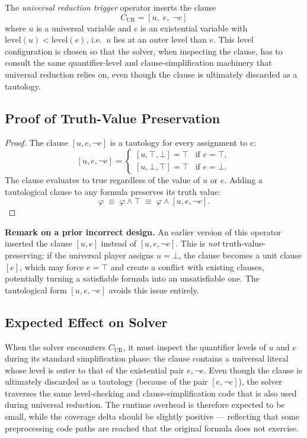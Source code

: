 The \emph{universal reduction trigger} operator inserts the clause
\[
  C_{\mathrm{UR}} = [u,\; e,\; \lnot e]
\]
where $u$ is a universal variable and $e$ is an existential variable with $\mathrm{level}(u) < \mathrm{level}(e)$, i.e.\ $u$ lies at an outer level than $e$. This level configuration is chosen so that the solver, when inspecting the clause, has to consult the same quantifier-level and clause-simplification machinery that universal reduction relies on, even though the clause is ultimately discarded as a tautology.

\subsection{Proof of Truth-Value Preservation}

\begin{proof}
The clause $[u, e, \lnot e]$ is a tautology for every assignment to $e$:
\[
  [u, e, \lnot e] =
  \begin{cases}
    [u, \top, \bot] = \top & \text{if } e = \top,\\
    [u, \bot, \top] = \top & \text{if } e = \bot.
  \end{cases}
\]
The clause evaluates to true regardless of the value of $u$ or $e$. Adding a tautological clause to any formula preserves its truth value:
\[
  \varphi \;\equiv\; \varphi \land \top \;\equiv\; \varphi \land [u, e, \lnot e].
\]
\end{proof}

\textbf{Remark on a prior incorrect design.} An earlier version of this operator inserted the clause $[u, e]$ instead of $[u, e, \lnot e]$. This is \emph{not} truth-value-preserving: if the universal player assigns $u = \bot$, the clause becomes a unit clause $[e]$, which may force $e = \top$ and create a conflict with existing clauses, potentially turning a satisfiable formula into an unsatisfiable one. The tautological form $[u, e, \lnot e]$ avoids this issue entirely.

\subsection{Expected Effect on Solver}

When the solver encounters $C_{\mathrm{UR}}$, it must inspect the quantifier levels of $u$ and $e$ during its standard simplification phase: the clause contains a universal literal whose level is outer to that of the existential pair $e, \lnot e$. Even though the clause is ultimately discarded as a tautology (because of the pair $[e, \lnot e]$), the solver traverses the same level-checking and clause-simplification code that is also used during universal reduction. The runtime overhead is therefore expected to be small, while the coverage delta should be slightly positive --- reflecting that some preprocessing code paths are reached that the original formula does not exercise.

